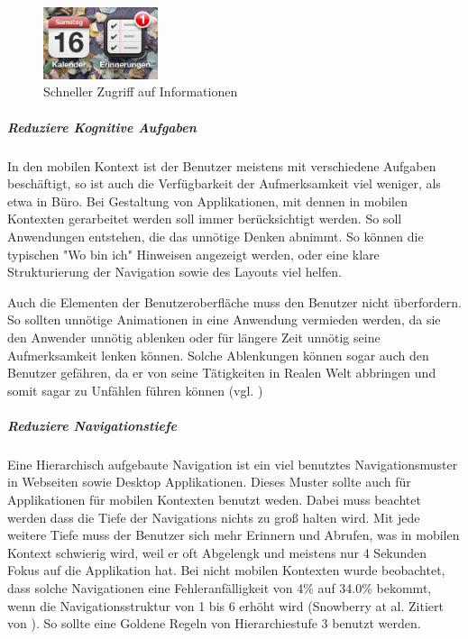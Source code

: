 \begin{figure}
	\begin{center}
	
	\includegraphics[width=0.3\textwidth]{img/iconIos.png}
	\caption{Schneller Zugriff auf Informationen}\label{fig:iconIos}
\end{center}
\end{figure}

\subparagraph{Reduziere Kognitive Aufgaben} 
\label{subp:reduziere_kognitive_aufgaben_}

In den mobilen Kontext ist der Benutzer meistens mit verschiedene Aufgaben beschäftigt, so ist auch die Verfügbarkeit der Aufmerksamkeit viel weniger, als etwa in Büro. Bei Gestaltung von Applikationen, mit dennen in mobilen Kontexten gerarbeitet werden soll immer berücksichtigt werden. So soll Anwendungen entstehen, die das unnötige Denken abnimmt. So können die typischen "Wo bin ich" Hinweisen angezeigt werden, oder eine klare Strukturierung der Navigation sowie des Layouts viel helfen. 

Auch die Elementen der Benutzeroberfläche muss den Benutzer nicht überfordern. So sollten unnötige Animationen in eine Anwendung vermieden werden, da sie den Anwender unnötig ablenken oder für längere Zeit unnötig seine Aufmerksamkeit lenken können. Solche Ablenkungen können sogar auch den Benutzer gefähren, da er von seine Tätigkeiten in Realen Welt abbringen und somit sagar zu Unfählen führen können (vgl. \cite{Nasar:2008cc})

\subparagraph{Reduziere Navigationstiefe} 
\label{subp:reduziere_das_w_hlen}

Eine Hierarchisch aufgebaute Navigation ist ein viel benutztes Navigationsmuster in Webseiten sowie Desktop Applikationen. Dieses Muster sollte auch für Applikationen für mobilen Kontexten benutzt weden. Dabei muss beachtet werden dass die Tiefe der Navigations nichts zu groß halten wird. Mit jede weitere Tiefe muss der Benutzer sich mehr Erinnern und Abrufen, was in mobilen Kontext schwierig wird, weil er oft Abgelengk und meistens nur 4 Sekunden Fokus auf die Applikation hat\cite{Oulasvirta:2005vn}. Bei nicht mobilen Kontexten wurde beobachtet, dass solche Navigationen eine Fehleranfälligkeit von 4\% auf 34.0\% bekommt, wenn die Navigationsstruktur von 1 bis 6 erhöht wird (Snowberry at al. Zitiert von \cite{Chae:2004gp}). So sollte eine Goldene Regeln von Hierarchiestufe 3 benutzt werden.


